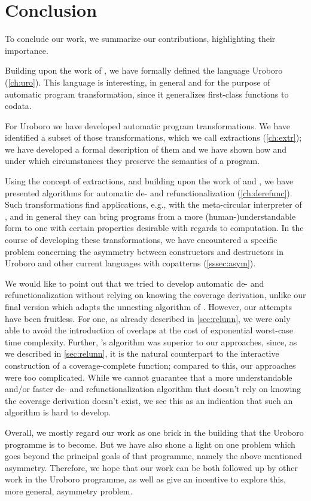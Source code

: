 \chapter{Conclusion}
\label{ch:concl}

To conclude our work, we summarize our contributions, highlighting their importance.

Building upon the work of \citet{rendel15automatic}, we have formally defined the language Uroboro (\autoref{ch:uro}). This language is interesting, in general and for the purpose of automatic program transformation, since it generalizes first-class functions to codata.

For Uroboro we have developed automatic program transformations. We have identified a subset of those transformations, which we call extractions (\autoref{ch:extr}); we have developed a formal description of them and we have shown how and under which circumstances they preserve the semantics of a program.

Using the concept of extractions, and building upon the work of \citet{rendel15automatic} and \citet{setzer14unnesting}, we have presented algorithms for automatic de- and refunctionalization (\autoref{ch:derefunc}). Such transformations find applications, e.g., with the meta-circular interpreter of \citet{reynolds72definitional}, and in general they can bring programs from a more (human-)understandable form to one with certain properties desirable with regards to computation. In the course of developing these transformations, we have encountered a specific problem concerning the asymmetry between constructors and destructors in Uroboro and other current languages with copatterns (\autoref{sssec:asym}).

We would like to point out that we tried to develop automatic de- and refunctionalization without relying on knowing the coverage derivation, unlike our final version which adapts the unnesting algorithm of \citet{setzer14unnesting}. However, our attempts have been fruitless. For one, as already described in \autoref{sec:relunn}, we were only able to avoid the introduction of overlaps at the cost of exponential worst-case time complexity. Further, \citeauthor{setzer14unnesting}'s algorithm was superior to our approaches, since, as we described in \autoref{sec:relunn}, it is the natural counterpart to the interactive construction of a coverage-complete function; compared to this, our approaches were too complicated. While we cannot guarantee that a more understandable and/or faster de- and refunctionalization algorithm that doesn't rely on knowing the coverage derivation doesn't exist, we see this as an indication that such an algorithm is hard to develop.

Overall, we mostly regard our work as one brick in the building that the Uroboro programme is to become. But we have also shone a light on one problem which goes beyond the principal goals of that programme, namely the above mentioned asymmetry. Therefore, we hope that our work can be both followed up by other work in the Uroboro programme, as well as give an incentive to explore this, more general, asymmetry problem.